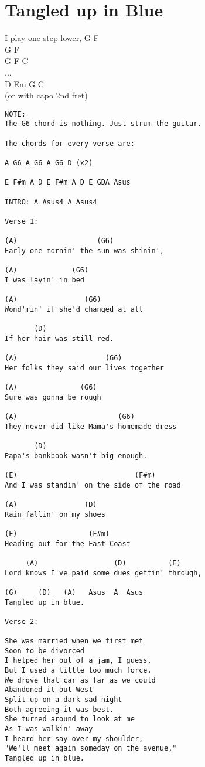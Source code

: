 \documentclass[leqno]{memoir}
\begin{document}
\chapter{Tangled up in Blue}
I play one step lower,
G F\\
G F \\
G F C\\
...\\
D Em G C\\
(or with capo 2nd fret)
\begin{verbatim}
NOTE:   
The G6 chord is nothing. Just strum the guitar.

The chords for every verse are:

A G6 A G6 A G6 D (x2)

E F#m A D E F#m A D E GDA Asus

INTRO: A Asus4 A Asus4

Verse 1:

(A)                   (G6)
Early one mornin' the sun was shinin',

(A)             (G6)
I was layin' in bed

(A)                (G6)
Wond'rin' if she'd changed at all

       (D)              
If her hair was still red.

(A)                     (G6)
Her folks they said our lives together

(A)               (G6)
Sure was gonna be rough

(A)                        (G6)
They never did like Mama's homemade dress

       (D)
Papa's bankbook wasn't big enough.

(E)                            (F#m)
And I was standin' on the side of the road

(A)                (D)
Rain fallin' on my shoes

(E)                 (F#m)
Heading out for the East Coast

     (A)                  (D)          (E)
Lord knows I've paid some dues gettin' through,

(G)     (D)   (A)   Asus  A  Asus
Tangled up in blue.

Verse 2:

She was married when we first met
Soon to be divorced
I helped her out of a jam, I guess,
But I used a little too much force.
We drove that car as far as we could
Abandoned it out West
Split up on a dark sad night
Both agreeing it was best.
She turned around to look at me
As I was walkin' away
I heard her say over my shoulder,
"We'll meet again someday on the avenue,"
Tangled up in blue.


\end{verbatim}
\end{document}
